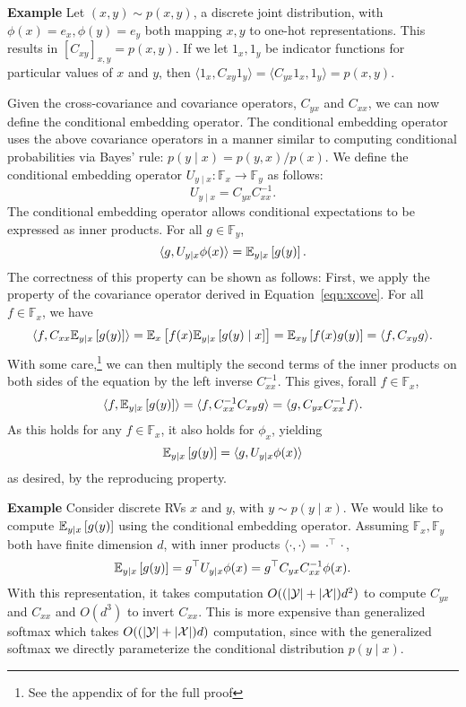 \documentclass{article}
\begin{document}
\textbf{Example}
Let $(x,y)\sim p(x,y)$, a discrete joint distribution,
with $\phi(x)=e_x,\phi(y)=e_y$ both mapping $x,y$ to one-hot representations.
This results in $[C_{xy}]_{x,y}=p(x,y)$.
If we let $1_x,1_y$ be indicator functions for particular values of $x$ and $y$,
then $\langle 1_x, C_{xy}1_y\rangle = \langle C_{yx}1_x, 1_y\rangle= p(x,y)$.

Given the cross-covariance and covariance operators, $C_{yx}$ and $C_{xx}$,
we can now define the conditional embedding operator.
The conditional embedding operator uses the above covariance operators in a manner
similar to computing conditional probabilities via Bayes' rule: $p(y\mid x) = p(y,x)/p(x)$.
We define the conditional embedding operator $U_{y\mid x}: \mathbb{F}_x\to\mathbb{F}_y$
as follows:
\begin{equation}
    \label{eqn:conditional-mean}
    U_{y\mid x} = C_{yx}C_{xx}^{-1}.
\end{equation}
The conditional embedding operator allows conditional expectations to be
expressed as inner products.
For all $g \in \mathbb{F}_y$,
\begin{equation}
\label{eqn:conditional-expectation}
\langle g, U_{y\mid x}\phi(x) \rangle = \mathbb{E}_{y\mid x}\left[g(y)\right].
\end{equation}
The correctness of this property can be shown as follows:
First, we apply the property of the covariance operator derived in
Equation~\ref{eqn:xcove}. For all $f\in\mathbb{F}_x$, we have
\begin{equation}
\label{eqn:prf-conditional-expectation}
    \langle f, C_{xx}\mathbb{E}_{y\mid x}\left[g(y)\right]\rangle
    = \mathbb{E}_{x}\left[f(x)\mathbb{E}_{y\mid x}\left[g(y)\mid x\right]\right]
    = \mathbb{E}_{xy}\left[f(x)g(y)\right]
    = \langle f, C_{xy}g\rangle.
\end{equation}
With some care,\footnote{
See the appendix of \citet{fukumizu2004kernel} for the full proof}
we can then multiply the second terms of the inner products on both sides
of the equation by the left inverse $C_{xx}^{-1}$.
This gives, forall $f\in\mathbb{F}_x$,
$$\langle f, \mathbb{E}_{y\mid x}\left[g(y)\right]\rangle = \langle f, C_{xx}^{-1}C_{xy}g \rangle
= \langle g, C_{yx}C_{xx}^{-1}f\rangle.$$
As this holds for any $f\in\mathbb{F}_x$, it also holds for $\phi_x$,
yielding
$$
\mathbb{E}_{y\mid x}\left[g(y)\right] = \langle g, U_{y\mid x}\phi(x)\rangle
$$
as desired, by the reproducing property.

\textbf{Example}
Consider discrete RVs $x$ and $y$, with $y\sim p(y\mid x)$.
We would like to compute $\mathbb{E}_{y\mid x}\left[g(y)\right]$ using the conditional embedding operator.
Assuming $\mathbb{F}_x,\mathbb{F}_y$ both have finite dimension $d$,
with inner products $\langle\cdot,\cdot\rangle=\cdot^\top\cdot$,
$$\mathbb{E}_{y\mid x}\left[g(y)\right] = g^\top U_{y\mid x}\phi(x) = g^\top C_{yx}C_{xx}^{-1}\phi(x).$$
With this representation, it takes computation $O((|\mathcal{Y}|+|\mathcal{X}|)d^2)$
to compute $C_{yx}$ and $C_{xx}$ and $O(d^3)$ to invert $C_{xx}$.
This is more expensive than generalized softmax
which takes $O((|\mathcal{Y}|+|\mathcal{X}|)d)$ computation,
since with the generalized softmax we directly parameterize the conditional distribution
$p(y\mid x)$.
\end{document}
